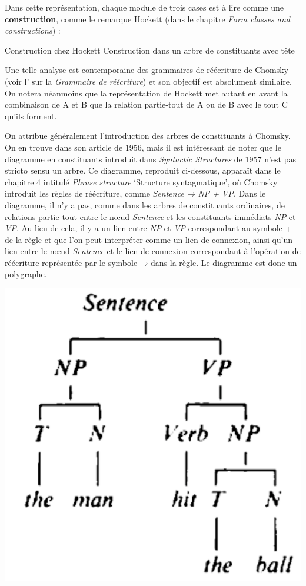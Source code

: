 {    Dans cette représentation, chaque module de trois cases est à lire comme une \textbf{construction}, comme le remarque Hockett (dans le chapitre \textit{Form classes and constructions}) :

    \ea

    Construction chez Hockett            Construction dans un arbre de constituants avec tête
    \z


    Une telle analyse est contemporaine des grammaires de réécriture de Chomsky (voir l’ sur la \textit{Grammaire de réécriture}) et son objectif est absolument similaire. On notera néanmoins que la représentation de Hockett met autant en avant la combinaison de A et B que la relation partie-tout de A ou de B avec le tout C qu’ils forment.

    On attribue généralement l’introduction des arbres de constituants à Chomsky. On en trouve dans son article de 1956, mais il est intéressant de noter que le diagramme en constituants introduit dans \textit{Syntactic Structures} de 1957 n’est pas stricto sensu un arbre. Ce diagramme, reproduit ci-dessous, apparaît dans le chapitre 4 intitulé \textit{Phrase structure} ‘Structure syntagmatique’, où Chomsky introduit les règles de réécriture, comme \textit{Sentence → NP + VP}. Dans le diagramme, il n’y a pas, comme dans les arbres de constituants ordinaires, de relations partie-tout entre le nœud \textit{Sentence} et les constituants immédiats \textit{NP} et \textit{VP}. Au lieu de cela, il y a un lien entre \textit{NP} et \textit{VP} correspondant au symbole + de la règle et que l’on peut interpréter comme un lien de connexion, ainsi qu’un lien entre le nœud \textit{Sentence} et le lien de connexion correspondant à l’opération de réécriture représentée par le symbole \textit{→} dans la règle. Le diagramme est donc un polygraphe.

    \ea
    \citealt{Chomsky1957}
    \includegraphics[width=\textwidth]{figures/vol1syntaxe2-img026.png}

}
